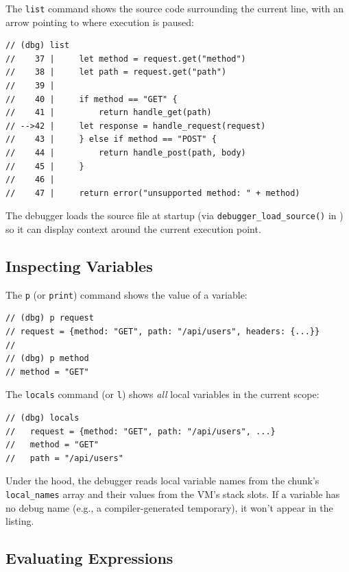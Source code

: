 The \lstinline|list| command shows the source code surrounding the current line, with an arrow pointing to where execution is paused:

\begin{lstlisting}[language=Lattice, caption={Viewing source context}]
// (dbg) list
//    37 |     let method = request.get("method")
//    38 |     let path = request.get("path")
//    39 |
//    40 |     if method == "GET" {
//    41 |         return handle_get(path)
// -->42 |     let response = handle_request(request)
//    43 |     } else if method == "POST" {
//    44 |         return handle_post(path, body)
//    45 |     }
//    46 |
//    47 |     return error("unsupported method: " + method)
\end{lstlisting}

The debugger loads the source file at startup (via \lstinline|debugger_load_source()| in ) so it can display context around the current execution point.

\subsection{Inspecting Variables}\label{sec:debug-inspect}

The \lstinline|p| (or \lstinline|print|) command shows the value of a variable:

\begin{lstlisting}[language=Lattice, caption={Printing a variable}]
// (dbg) p request
// request = {method: "GET", path: "/api/users", headers: {...}}
//
// (dbg) p method
// method = "GET"
\end{lstlisting}

The \lstinline|locals| command (or \lstinline|l|) shows \emph{all} local variables in the current scope:

\begin{lstlisting}[language=Lattice, caption={Viewing all local variables}]
// (dbg) locals
//   request = {method: "GET", path: "/api/users", ...}
//   method = "GET"
//   path = "/api/users"
\end{lstlisting}

Under the hood, the debugger reads local variable names from the chunk's \lstinline|local_names| array and their values from the VM's stack slots.
If a variable has no debug name (e.g., a compiler-generated temporary), it won't appear in the listing.

\subsection{Evaluating Expressions}\label{sec:debug-eval}

